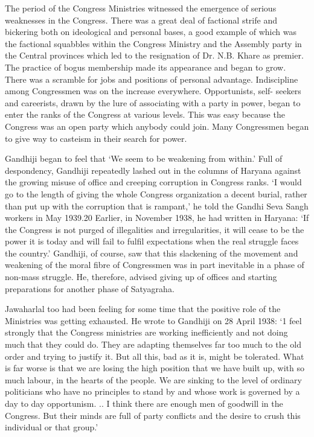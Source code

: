 \begin{multicols}{2}
The period of the Congress Ministries witnessed the emergence of serious weaknesses in the Congress. There was a great deal of factional strife and bickering both on ideological and personal bases, a good example of which was the factional squabbles within the Congress Ministry and the Assembly party in the Central provinces which led to the resignation of Dr. N.B. Khare as premier. The practice of bogus membership made its appearance and began to grow. There was a scramble for jobs and positions of personal advantage. Indiscipline among Congressmen was on the increase everywhere. Opportunists, self- seekers and careerists, drawn by the lure of associating with a party in power, began to enter the ranks of the Congress at various levels. This was easy because the Congress was an open party which anybody could join. Many Congressmen began to give way to casteism in their search for power. 

Gandhiji began to feel that `We seem to be weakening from within.' Full of despondency, Gandhiji repeatedly lashed out in the columns of Haryana against the growing misuse of office and creeping corruption in Congress ranks. `I would go to the length of giving the whole Congress organization a decent burial, rather than put up with the corruption that is rampant,' he told the Gandhi Seva Sangh workers in May 1939.20 Earlier, in November 1938, he had written in Haryana: `If the Congress is not purged of illegalities and irregularities, it will cease to be the power it is today and will fail to fulfil expectations when the real struggle faces the country.' Gandhiji, of course, saw that this slackening of the movement and weakening of the moral fibre of Congressmen was in part inevitable in a phase of non-mass struggle. He, therefore, advised giving up of offices and starting preparations for another phase of Satyagraha. 

Jawaharlal too had been feeling for some time that the positive role of the Ministries was getting exhausted. He wrote to Gandhiji on 28 April 1938: `1 feel strongly that the Congress ministries are working inefficiently and not doing much that they could do. They are adapting themselves far too much to the old order and trying to justify it. But all this, bad as it is, might be tolerated. What is far worse is that we are losing the high position that we have built up, with so much labour, in the hearts of the people. We are sinking to the level of ordinary politicians who have no principles to stand by and whose work is governed by a day to day opportunism. .. I think there are enough men of goodwill in the Congress. But their minds are full of party conflicts and the desire to crush this individual or that group.' 


\end{multicols}
